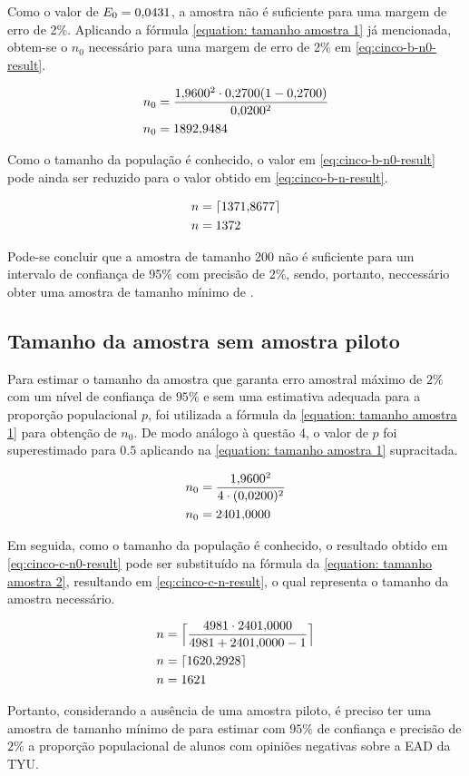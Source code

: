	Como o valor de $E_0 = \num{0.0431}$, a amostra não é suficiente para uma
	margem de erro de 2\%. Aplicando a fórmula \autoref{equation: tamanho amostra 1} já
	mencionada, obtem-se o $n_0$ necessário para uma margem de erro de 2\%
	em \eqref{eq:cinco-b-n0-result}.

	\begin{align}
		n_0 &= \frac{\num{1.96}^2 \cdot \num{0.27}(1-\num{0.27})}{\num{0.02}^2} \nonumber \\
		n_0	&= \label{eq:cinco-b-n0-result}
			   \num{1892.9484}	
	\end{align}

	Como o tamanho da população é conhecido, o valor em
	\eqref{eq:cinco-b-n0-result} pode ainda ser reduzido para o valor obtido
	em \eqref{eq:cinco-b-n-result}.

	\begin{align}
		n &= \lceil \num{1371.8677} \nonumber \rceil \\
		n  &= \label{eq:cinco-b-n-result} 
			 1372
	\end{align}

	Pode-se concluir que a amostra de tamanho 200 não é suficiente para um
	intervalo de confiança de 95\% com precisão de 2\%, sendo, portanto,
	neccessário obter uma amostra de tamanho mínimo de \CINCOBnceil.

\subsection{Tamanho da amostra sem amostra piloto}

	Para estimar o tamanho da amostra que garanta erro amostral máximo de
	$2\%$ com um nível de confiança de $95\%$ e sem uma estimativa adequada
	para a proporção populacional $p$, foi utilizada a fórmula da
	\autoref{equation: tamanho amostra 1} para obtenção de $n_0$.  
	De modo análogo à questão 4, o valor de $p$ foi superestimado para $\num{0.5}$ 
	aplicando na \autoref{equation: tamanho amostra 1} supracitada.

	\begin{align}
		n_0 &= \frac{\num{1.96}^2}{4 \cdot (\num{0.02})^2} \nonumber \\
		n_0	&= \label{eq:cinco-c-n0-result}
			   \num{2401.0000}
	\end{align}

	Em seguida, como o tamanho da população é conhecido, o resultado obtido
	em \eqref{eq:cinco-c-n0-result} pode ser substituído na fórmula da
	\autoref{equation: tamanho amostra 2}, resultando em \eqref{eq:cinco-c-n-result}, o qual
	representa o tamanho da amostra necessário.

	\begin{align}
		n &= \Big\lceil \frac{4981 \cdot \num{2401.0000}}{4981 + \num{2401.0000} - 1}
		  \nonumber \Big\rceil \\
		n  &= \lceil \num{1620.2928} \nonumber \rceil\\
		n  &= \label{eq:cinco-c-n-result} 
			 1621
	\end{align}

	Portanto, considerando a ausência de uma amostra piloto, é preciso ter
	uma amostra de tamanho mínimo de \CINCOCnceil para estimar com $95\%$ de
	confiança e precisão de $2\%$ a proporção populacional de alunos com
	opiniões negativas sobre a EAD da TYU.

